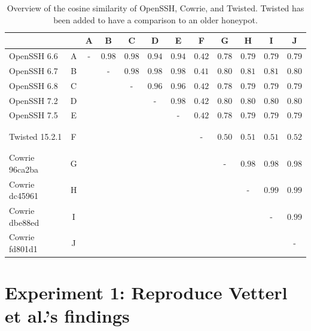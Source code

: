 \begin{table}[htbp]
    \caption[Overview of the cosine similarity of OpenSSH, Cowrie, and Twisted]{
        Overview of the cosine similarity of OpenSSH, Cowrie, and Twisted.
        Twisted has been added to have a comparison to an older honeypot.
    }
    \begin{tabular}{lc|cccccccccc}
    \toprule
                   &   & A & B      & C      & D      & E      & F      & G      & H      & I      & J      \\
    \hline
    OpenSSH 6.6    & A & - & $0.98$ & $0.98$ & $0.94$ & $0.94$ & $0.42$ & $0.78$ & $0.79$ & $0.79$ & $0.79$ \\
    OpenSSH 6.7    & B &   & -      & $0.98$ & $0.98$ & $0.98$ & $0.41$ & $0.80$ & $0.81$ & $0.81$ & $0.80$ \\
    OpenSSH 6.8    & C &   &        & -      & $0.96$ & $0.96$ & $0.42$ & $0.78$ & $0.79$ & $0.79$ & $0.79$ \\
    OpenSSH 7.2    & D &   &        &        & -      & $0.98$ & $0.42$ & $0.80$ & $0.80$ & $0.80$ & $0.80$ \\
    OpenSSH 7.5    & E &   &        &        &        & -      & $0.42$ & $0.78$ & $0.79$ & $0.79$ & $0.79$ \\
    \\
    \cline{1-2} \cline{8-12}
    \\
    Twisted 15.2.1 & F &   &        &        &        &        & -      & $0.50$ & $0.51$ & $0.51$ & $0.52$ \\
    \\
    \cline{1-2} \cline{9-12}
    \\
    Cowrie 96ca2ba & G &   &        &        &        &        &        & -      & $0.98$ & $0.98$ & $0.98$ \\
    Cowrie dc45961 & H &   &        &        &        &        &        &        & -      & $0.99$ & $0.99$ \\
    Cowrie dbe88ed & I &   &        &        &        &        &        &        &        & -      & $0.99$ \\
    Cowrie fd801d1 & J &   &        &        &        &        &        &        &        &        & -      \\
    \bottomrule
    \end{tabular}
    \label{tab:cosine-similarity}
\end{table}

\section{Experiment 1: Reproduce Vetterl et al.'s findings}

